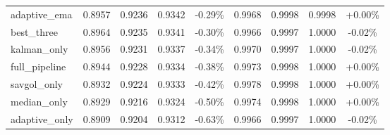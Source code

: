 \begin{table}[htbp]
\begin{adjustbox}{max width=\textwidth}
\begin{tabular}{l cccc cccc}
adaptive\_ema & 0.8957 & 0.9236 & 0.9342 & -0.29\% & 0.9968 & 0.9998 & 0.9998 & +0.00\% \\
best\_three & 0.8964 & 0.9235 & 0.9341 & -0.30\% & 0.9966 & 0.9997 & 1.0000 & -0.02\% \\
kalman\_only & 0.8956 & 0.9231 & 0.9337 & -0.34\% & 0.9970 & 0.9997 & 1.0000 & -0.02\% \\
full\_pipeline & 0.8944 & 0.9228 & 0.9334 & -0.38\% & 0.9973 & 0.9998 & 1.0000 & +0.00\% \\
savgol\_only & 0.8932 & 0.9224 & 0.9333 & -0.42\% & 0.9978 & 0.9998 & 1.0000 & +0.00\% \\
median\_only & 0.8929 & 0.9216 & 0.9324 & -0.50\% & 0.9974 & 0.9998 & 1.0000 & +0.00\% \\
adaptive\_only & 0.8909 & 0.9204 & 0.9312 & -0.63\% & 0.9966 & 0.9997 & 1.0000 & -0.02\% \\
\bottomrule
\end{tabular}
\end{adjustbox}
\end{table}
